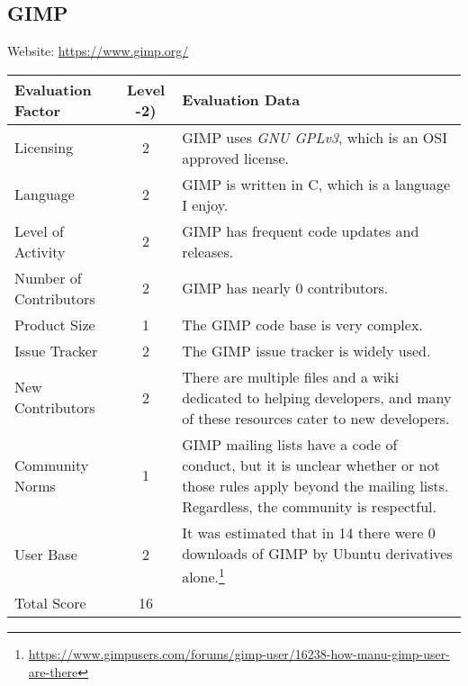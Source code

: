 \documentclass[11pt]{article}
\begin{document}
\subsection{GIMP}
\nopagebreak
Website: \url{https://www.gimp.org/}
\nopagebreak
\begin{center}
\begin{tabularx}{\textwidth}{|l|c|X|}
	\hline
	\textbf{Evaluation Factor} & \textbf{Level -2)} & \textbf{Evaluation Data} \\\hline
	Licensing & 2 & GIMP uses \textit{GNU GPLv3}, which is an OSI approved license.\\\hline
	Language & 2 & GIMP is written in C, which is a language I enjoy.\\\hline
	Level of Activity & 2 & GIMP has frequent code updates and releases.\\\hline
	Number of Contributors & 2 & GIMP has nearly 0 contributors.\\\hline
	Product Size & 1 & The GIMP code base is very complex.\\\hline
	Issue Tracker & 2 & The GIMP issue tracker is widely used.\\\hline
	New Contributors & 2 & There are multiple files and a wiki dedicated to helping developers, and many of these resources cater to new developers.\\\hline
	Community Norms & 1 & GIMP mailing lists have a code of conduct, but it is unclear whether or not those rules apply beyond the mailing lists.  Regardless, the community is respectful.\\\hline
	User Base & 2 & It was estimated that in 14 there were 0 downloads of GIMP by Ubuntu derivatives alone.\footnote{\url{https://www.gimpusers.com/forums/gimp-user/16238-how-manu-gimp-user-are-there}}\\\hline
	Total Score & 16 & \\\hline
\end{tabularx}
\end{center}
\end{document}
